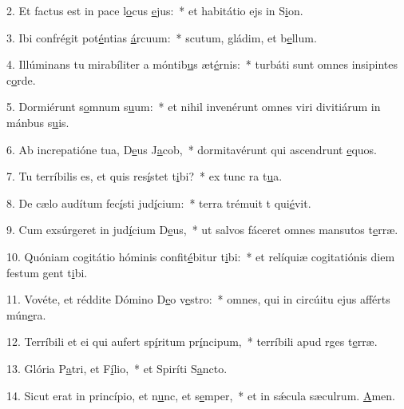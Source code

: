 2. Et factus est in pace l\uline{o}cus \uline{e}jus:~* et habitátio ejs in S\uline{i}on.\par 
3. Ibi confrégit pot\uline{é}ntias \uline{á}rcuum:~* scutum, gládim, et b\uline{e}llum.\par 
4. Illúminans tu mirabíliter a móntib\uline{u}s æt\uline{é}rnis:~* turbáti sunt omnes insipintes c\uline{o}rde.\par 
5. Dormiérunt s\uline{o}mnum s\uline{u}um:~* et nihil invenérunt omnes viri divitiárum in mánbus s\uline{u}is.\par 
6. Ab increpatióne tua, D\uline{e}us J\uline{a}cob,~* dormitavérunt qui ascendrunt \uline{e}quos.\par 
7. Tu terríbilis es, et quis res\uline{í}stet t\uline{i}bi?~* ex tunc ra t\uline{u}a.\par 
8. De cælo audítum fec\uline{í}sti jud\uline{í}cium:~* terra trémuit t qui\uline{é}vit.\par 
9. Cum exsúrgeret in jud\uline{í}cium D\uline{e}us,~* ut salvos fáceret omnes mansutos t\uline{e}rræ.\par 
10. Quóniam cogitátio hóminis confit\uline{é}bitur t\uline{i}bi:~* et relíquiæ cogitatiónis diem festum gent t\uline{i}bi.\par 
11. Vovéte, et réddite Dómino D\uline{e}o v\uline{e}stro:~* omnes, qui in circúitu ejus afférts mún\uline{e}ra.\par 
12. Terríbili et ei qui aufert sp\uline{í}ritum pr\uline{í}ncipum,~* terríbili apud rges t\uline{e}rræ.\par 
13. Glória P\uline{a}tri, et F\uline{í}lio,~* et Spiríti S\uline{a}ncto.\par 
14. Sicut erat in princípio, et n\uline{u}nc, et s\uline{e}mper,~* et in sǽcula sæculrum. \uline{A}men.\par 
